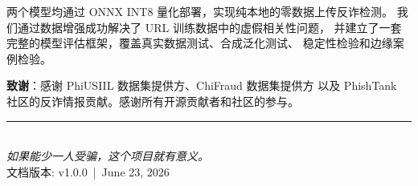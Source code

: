\documentclass[11pt,a4paper]{article}
\begin{document}
两个模型均通过 ONNX INT8 量化部署，实现纯本地的零数据上传反诈检测。
我们通过数据增强成功解决了 URL 训练数据中的虚假相关性问题，
并建立了一套完整的模型评估框架，覆盖真实数据测试、合成泛化测试、
稳定性检验和边缘案例检验。

\textbf{致谢}：感谢 PhiUSIIL 数据集提供方、ChiFraud 数据集提供方
以及 PhishTank 社区的反诈情报贡献。感谢所有开源贡献者和社区的参与。

\vspace{0.5cm}
\begin{center}
\rule{0.3\textwidth}{0.5pt}\\
{\small\color{primaryblue} \textit{如果能少一人受骗，这个项目就有意义。}}\\
{\small 文档版本: v1.0.0 \,|\, June 23, 2026}
\end{center}
\end{document}
